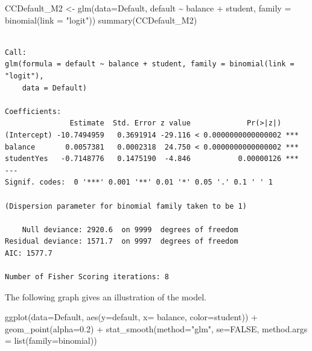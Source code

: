 \documentclass[
  letterpaper,
  DIV=11,
  numbers=noendperiod]{scrreprt}
\newenvironment{Shaded}{\begin{snugshade}}{\end{snugshade}}
\newcommand{\AttributeTok}[1]{\textcolor[rgb]{0.40,0.45,0.13}{#1}}
\newcommand{\ConstantTok}[1]{\textcolor[rgb]{0.56,0.35,0.01}{#1}}
\newcommand{\FloatTok}[1]{\textcolor[rgb]{0.68,0.00,0.00}{#1}}
\newcommand{\FunctionTok}[1]{\textcolor[rgb]{0.28,0.35,0.67}{#1}}
\newcommand{\NormalTok}[1]{\textcolor[rgb]{0.00,0.23,0.31}{#1}}
\newcommand{\OtherTok}[1]{\textcolor[rgb]{0.00,0.23,0.31}{#1}}
\newcommand{\SpecialCharTok}[1]{\textcolor[rgb]{0.37,0.37,0.37}{#1}}
\newcommand{\StringTok}[1]{\textcolor[rgb]{0.13,0.47,0.30}{#1}}
\begin{document}
\begin{Shaded}
\begin{Highlighting}[]
\NormalTok{CCDefault\_M2 }\OtherTok{\textless{}{-}} \FunctionTok{glm}\NormalTok{(}\AttributeTok{data=}\NormalTok{Default, default }\SpecialCharTok{\textasciitilde{}}\NormalTok{ balance }\SpecialCharTok{+}\NormalTok{ student, }\AttributeTok{family =} \FunctionTok{binomial}\NormalTok{(}\AttributeTok{link =} \StringTok{"logit"}\NormalTok{))}
\FunctionTok{summary}\NormalTok{(CCDefault\_M2)}
\end{Highlighting}
\end{Shaded}

\begin{verbatim}

Call:
glm(formula = default ~ balance + student, family = binomial(link = "logit"), 
    data = Default)

Coefficients:
               Estimate  Std. Error z value             Pr(>|z|)    
(Intercept) -10.7494959   0.3691914 -29.116 < 0.0000000000000002 ***
balance       0.0057381   0.0002318  24.750 < 0.0000000000000002 ***
studentYes   -0.7148776   0.1475190  -4.846           0.00000126 ***
---
Signif. codes:  0 '***' 0.001 '**' 0.01 '*' 0.05 '.' 0.1 ' ' 1

(Dispersion parameter for binomial family taken to be 1)

    Null deviance: 2920.6  on 9999  degrees of freedom
Residual deviance: 1571.7  on 9997  degrees of freedom
AIC: 1577.7

Number of Fisher Scoring iterations: 8
\end{verbatim}

The following graph gives an illustration of the model.

\begin{Shaded}
\begin{Highlighting}[]
\FunctionTok{ggplot}\NormalTok{(}\AttributeTok{data=}\NormalTok{Default, }\FunctionTok{aes}\NormalTok{(}\AttributeTok{y=}\NormalTok{default, }\AttributeTok{x=}\NormalTok{ balance, }\AttributeTok{color=}\NormalTok{student)) }\SpecialCharTok{+} \FunctionTok{geom\_point}\NormalTok{(}\AttributeTok{alpha=}\FloatTok{0.2}\NormalTok{) }\SpecialCharTok{+} \FunctionTok{stat\_smooth}\NormalTok{(}\AttributeTok{method=}\StringTok{"glm"}\NormalTok{, }\AttributeTok{se=}\ConstantTok{FALSE}\NormalTok{, }\AttributeTok{method.args =} \FunctionTok{list}\NormalTok{(}\AttributeTok{family=}\NormalTok{binomial)) }
\end{Highlighting}
\end{Shaded}
\end{document}
